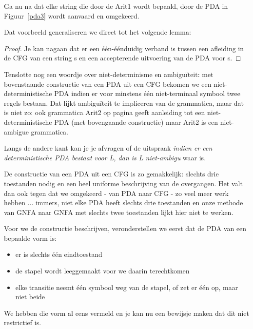 Ga nu na dat elke string die door de Arit1 wordt bepaald, door de PDA
in Figuur~\ref{pda3} wordt aanvaard en omgekeerd.


Dat voorbeeld generaliseren we direct tot het volgende lemma:

{}
\begin{proof}
Je kan nagaan dat er een \'{e}\'{e}n-\'{e}\'{e}nduidig verband is
tussen een afleiding in de CFG van een string s en een accepterende
uitvoering van de PDA voor s.  \end{proof} 

Tenslotte nog een woordje over niet-determinisme en ambigu\"{i}teit: met
bovenstaande constructie van een PDA uit een CFG bekomen we een
niet-deterministische PDA indien er voor minstens \'{e}\'{e}n
niet-terminaal symbool twee regels bestaan. Dat lijkt ambigu\"{i}teit te
impliceren van de grammatica, maar dat is niet zo: ook grammatica
Arit2 op pagina \pageref{arit2label} geeft aanleiding tot een
niet-deterministische PDA (met bovengaande constructie) maar Arit2 is
een niet-ambigue grammatica.  

Langs de andere kant kan je je afvragen of de uitspraak {\em indien er
een deterministische PDA bestaat voor L, dan is L niet-ambigu} waar
is.


De constructie van een PDA uit een CFG is zo gemakkelijk: slechts drie
toestanden nodig en een heel uniforme beschrijving van de
overgangen. Het valt dan ook tegen dat we omgekeerd - van PDA naar CFG
- zo veel meer werk hebben ... immers, niet elke PDA heeft slechts drie
toestanden en onze methode van GNFA naar GNFA met slechts twee
toestanden lijkt hier niet te werken.  

Voor we de constructie beschrijven, veronderstellen we eerst dat de
PDA van een bepaalde vorm is:
\begin{itemize}
\item er is slechts \'{e}\'{e}n eindtoestand
\item de stapel wordt leeggemaakt voor we daarin terechtkomen
\item elke transitie neemt \'{e}\'{e}n symbool weg van de stapel, of
zet er \'{e}\'{e}n op, maar niet beide
\end{itemize}
We hebben die vorm al eens vermeld en je kan nu een bewijsje maken
dat dit niet restrictief is.

